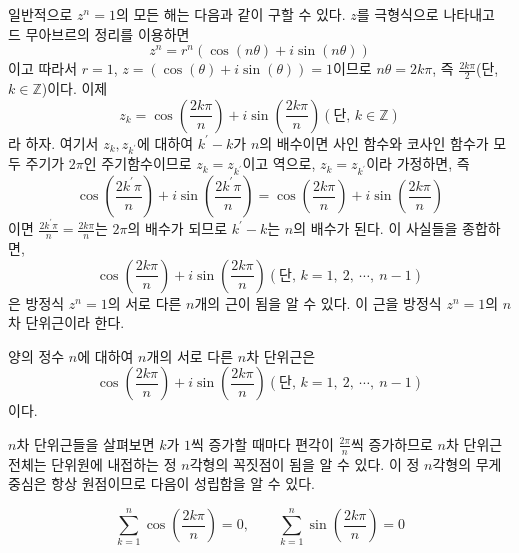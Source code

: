 \documentclass[11pt, a4paper]{book}
\begin{document}
\vspace{1em}
일반적으로 $z^{n} =1$의 모든 해는 다음과 같이 구할 수 있다. $z$를 극형식으로 나타내고 드 무아브르의 정리를 이용하면
\begin{equation*}
	z^n = r^n \left(\cos\left(n\theta\right) + i \sin\left(n\theta \right)\right)
\end{equation*}
이고 따라서 $r=1$, $z=\left(\cos(\theta) + i \sin(\theta)\right)=1$이므로 $n\theta=2k \pi$, 즉 $\frac{2k\pi}{2}$(단, $k \in \mathbb{Z}$)이다. 이제
\begin{equation*}
	z_{k} =\cos\left(\frac{2k\pi}{n}\right) + i \sin\left(\frac{2k\pi}{n}\right)(\text{단, }k\in \mathbb{Z})
\end{equation*}
라 하자. 여기서 $z_{k}, z_{k^{\prime}}$에 대하여 $k^{\prime}-k$가 $n$의 배수이면 사인 함수와 코사인 함수가 모두 주기가 $2\pi$인 주기함수이므로 $z_{k}=z_{k^{\prime}}$이고 역으로, $z_{k}=z_{k^{\prime}}$이라 가정하면, 즉
\begin{equation*}
\cos\left(\frac{2k^{\prime}\pi}{n}\right) + i \sin\left(\frac{2k^{\prime}\pi}{n}\right)=\cos\left(\frac{2k\pi}{n}\right) + i \sin\left(\frac{2k\pi}{n}\right)
\end{equation*}
이면 $\frac{2k^{\prime}\pi}{n}= \frac{2k\pi}{n}$는 $2\pi$의 배수가 되므로 $k^{\prime}-k$는 $n$의 배수가 된다. 이 사실들을 종합하면,
\begin{equation*}
	\cos\left(\frac{2k\pi}{n}\right) + i \sin\left(\frac{2k\pi}{n}\right) (\text{단, }k=1,\:2, \: \cdots,\: n-1)
\end{equation*}
은 방정식 $z^{n}=1$의 서로 다른 $n$개의 근이 됨을 알 수 있다. 이 근을 방정식 $ z^{n}=1$의 {\color{red}$n$차 단위근}이라 한다.
\begin{theorem}[단위근]
	양의 정수 $n$에 대하여 $n$개의 서로 다른 $n$차 단위근은
	\begin{equation*}
		\cos\left(\frac{2k\pi}{n}\right) + i \sin\left(\frac{2k\pi}{n}\right)(\text{단, }k=1,\:2, \: \cdots,\: n-1)
	\end{equation*}
이다.
\end{theorem}
$n$차 단위근들을 살펴보면 $k$가 $1$씩 증가할 때마다 편각이 $\frac{2\pi}{n}$씩 증가하므로 $n$차 단위근 전체는 단위원에 내접하는 정 $n$각형의 꼭짓점이 됨을 알 수 있다. 이 정 $n$각형의 무게중심은 항상 원점이므로 다음이 성립함을 알 수 있다.
\begin{theorem}
	\begin{equation*}
		\sum_{k=1}^{n} \cos\left(\frac{2k\pi}{n}\right)=0,\qquad 	\sum_{k=1}^{n} \sin\left(\frac{2k\pi}{n}\right)=0
	\end{equation*}
\end{theorem}
\end{document}

